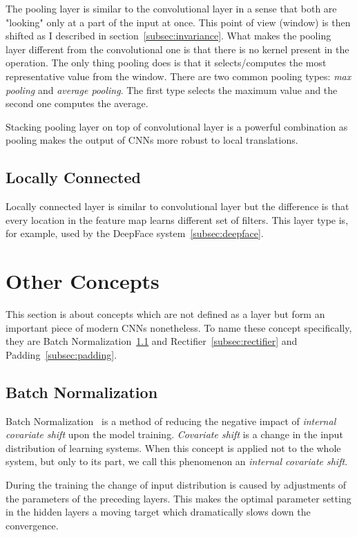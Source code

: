 The pooling layer is similar to the convolutional layer in a sense that both are "looking" only at a part of the input
at once.
This point of view (window) is then shifted as I described in section~\ref{subsec:invariance}.
What makes the pooling layer different from the convolutional one is that there is no kernel present in the operation.
The only thing pooling does is that it selects/computes the most representative value from the window.
There are two common pooling types: \textit{max pooling} and \textit{average pooling}.
The first type selects the maximum value and the second one computes the average.

Stacking pooling layer on top of convolutional layer is a powerful combination as pooling makes the output of CNNs
more robust to local translations\cite{DeepFace}.

\subsection{Locally Connected}\label{subsec:lclayer}
Locally connected layer is similar to convolutional layer but the difference is that every location in the feature map
learns different set of filters.
This layer type is, for example, used by the DeepFace system~\ref{subsec:deepface}.

\section{Other Concepts}\label{sec:otherconc}
This section is about concepts which are not defined as a layer but form an important piece of modern CNNs nonetheless.
To name these concept specifically, they are Batch Normalization~\ref{subsec:batchnorm} and
Rectifier~\ref{subsec:rectifier} and Padding~\ref{subsec:padding}.

\subsection{Batch Normalization}\label{subsec:batchnorm}
Batch Normalization~\cite{BatchNormalization} is a method of reducing the negative impact of \textit{internal covariate
shift} upon the model training.
\textit{Covariate shift} is a change in the input distribution of learning systems.
When this concept is applied not to the whole system, but only to its part, we call this phenomenon an \textit{internal
covariate shift}.

During the training the change of input distribution is caused by adjustments of the parameters of the preceding layers.
This makes the optimal parameter setting in the hidden layers a moving target which dramatically slows down the
convergence.

